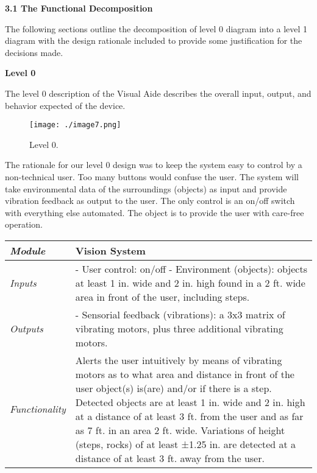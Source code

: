 \textbf{3.1 The Functional Decomposition}


The following sections outline the decomposition of level 0 diagram into
a level 1 diagram with the design rationale included to provide some
justification for the decisions made.



\textbf{Level 0}

The level 0 description of the Visual Aide describes the overall input,
output, and behavior expected of the device.

\begin{figure}[h]
\texttt{[image: ./image7.png]}
\caption{Level 0.}
\label{figure:caseStudyLevel0}
\end{figure}


The rationale for our level 0 design was to keep the system easy to
control by a non-technical user. Too many buttons would confuse the
user. The system will take environmental data of the surroundings
(objects) as input and provide vibration feedback as output to the user.
The only control is an on/off switch with everything else automated. The
object is to provide the user with care-free operation.


\begin{table}[h]

\label{table:caseStudyLevel0}
\begin{tabular}{|p{2cm}|p{10cm}|} \hline

\emph{Module} & Vision System \\ \hline

\emph{Inputs} & - User control: on/off
- Environment (objects): objects at least 1 in. wide and 2 in. high
found in a 2 ft. wide area in front of the user, including steps. \\ \hline

\emph{Outputs} & - Sensorial feedback (vibrations): a 3x3 matrix of
vibrating motors, plus three additional vibrating motors. \\ \hline

\emph{Functionality} & Alerts the user intuitively by means of vibrating
motors as to what area and distance in front of the user object(s)
is(are) and/or if there is a step. Detected objects are at least 1 in.
wide and 2 in. high at a distance of at least 3 ft. from the user and as
far as 7 ft. in an area 2 ft. wide. Variations of height (steps, rocks)
of at least ±1.25 in. are detected at a distance of at least 3 ft. away
from the user. \\ \hline
\end{tabular}
\end{table}

